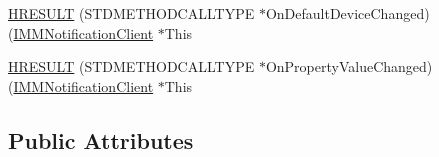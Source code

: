 \begin{DoxyCompactItemize}
\item 
\hyperlink{struct_i_m_m_notification_client_vtbl_a7bea99e906a7334cf705832fa4d1fc13}{H\+R\+E\+S\+U\+LT} (S\+T\+D\+M\+E\+T\+H\+O\+D\+C\+A\+L\+L\+T\+Y\+PE $\ast$On\+Default\+Device\+Changed)(\hyperlink{mmdeviceapi_8h_a649fdb1d4867aa915327ca568a7bb278}{I\+M\+M\+Notification\+Client} $\ast$This
\item 
\hyperlink{struct_i_m_m_notification_client_vtbl_a5e3496d3e920e6a89ed5d71416f04f6d}{H\+R\+E\+S\+U\+LT} (S\+T\+D\+M\+E\+T\+H\+O\+D\+C\+A\+L\+L\+T\+Y\+PE $\ast$On\+Property\+Value\+Changed)(\hyperlink{mmdeviceapi_8h_a649fdb1d4867aa915327ca568a7bb278}{I\+M\+M\+Notification\+Client} $\ast$This
\end{DoxyCompactItemize}
\subsection*{Public Attributes}
